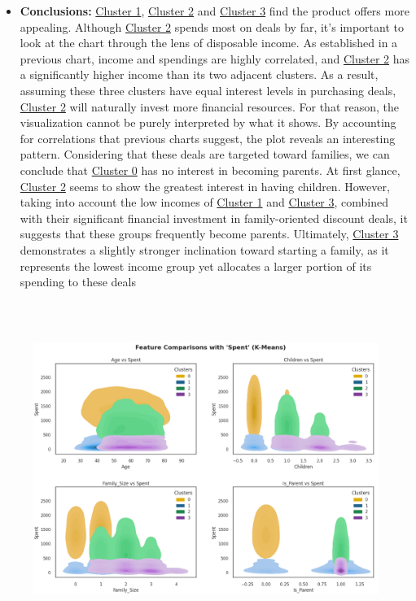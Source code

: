 \documentclass[11pt]{article}
\begin{document}
\begin{itemize}
	\item \textbf{Conclusions:} \uline{\textcolor[HTML]{0B5394}{Cluster 1}}, \uline{\textcolor[HTML]{38761D}{Cluster 2}} and \uline{\textcolor[HTML]{674EA7}{Cluster 3}} find the product offers more appealing. Although \uline{\textcolor[HTML]{38761D}{Cluster 2}} spends most on deals by far, it’s important to look at the chart through the lens of disposable income. As established in a previous chart, income and spendings are highly correlated, and \uline{\textcolor[HTML]{38761D}{Cluster 2}} has a significantly higher income than its two adjacent clusters. As a result, assuming these three clusters have equal interest levels in purchasing deals, \uline{\textcolor[HTML]{38761D}{Cluster 2}} will naturally invest more financial resources. For that reason, the visualization cannot be purely interpreted by what it shows. By accounting for correlations that previous charts suggest, the plot reveals an interesting pattern. Considering that these deals are targeted toward families, we can conclude that \uline{\textcolor[HTML]{BF9000}{Cluster 0}} has no interest in becoming parents. At first glance, \uline{\textcolor[HTML]{38761D}{Cluster 2}} seems to show the greatest interest in having children. However, taking into account the low incomes of \uline{\textcolor[HTML]{0B5394}{Cluster 1}} and \uline{\textcolor[HTML]{674EA7}{Cluster 3}}, combined with their significant financial investment in family-oriented discount deals, it suggests that these groups frequently become parents. Ultimately, \uline{\textcolor[HTML]{674EA7}{Cluster 3}} demonstrates a slightly stronger inclination toward starting a family, as it represents the lowest income group yet allocates a larger portion of its spending to these deals

\end{itemize}
\vspace{2\baselineskip}
\begin{figure}[H]
\centering
\includegraphics[width=14.81cm,height=10.85cm]{./images/image1.png}
\end{figure}
\end{document}
